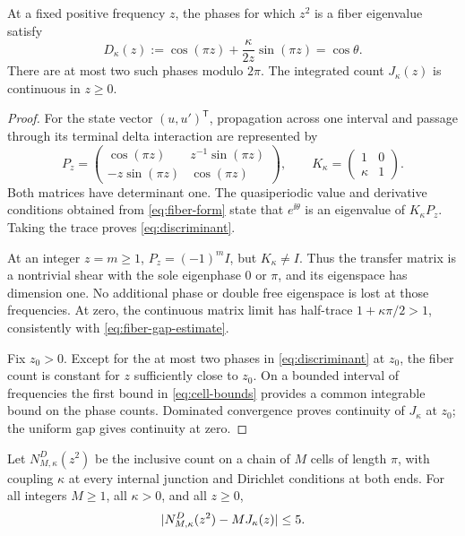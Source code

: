 \begin{lemma}
\label{lem:phase}
At a fixed positive frequency $z$, the phases for which $z^2$
is a fiber eigenvalue satisfy
\begin{equation}
 D_\kappa(z):=\cos(\pi z)+\frac{\kappa}{2z}\sin(\pi z)
                   =\cos\theta.
 \label{eq:discriminant}
\end{equation}
There are at most two such phases modulo $2\pi$.
The integrated count $J_\kappa(z)$ is continuous in $z\ge0$.
\end{lemma}

\begin{proof}
For the state vector $(u,u')^{\mathsf T}$, propagation across
one interval and passage through its terminal delta interaction
are represented by
\begin{equation}
 P_z=\begin{pmatrix}
       \cos(\pi z)&z^{-1}\sin(\pi z)\\
       -z\sin(\pi z)&\cos(\pi z)
     \end{pmatrix},
 \qquad
 K_\kappa=\begin{pmatrix}1&0\\\kappa&1\end{pmatrix}.
 \label{eq:transfer-matrices}
\end{equation}
Both matrices have determinant one. The quasiperiodic value
and derivative conditions obtained from \eqref{eq:fiber-form}
state that $e^{\ii\theta}$ is an eigenvalue of $K_\kappa P_z$.
Taking the trace proves \eqref{eq:discriminant}.

At an integer $z=m\ge1$, $P_z=(-1)^m I$, but
$K_\kappa\ne I$. Thus the transfer matrix is a nontrivial
shear with the sole eigenphase $0$ or $\pi$, and its eigenspace
has dimension one. No additional phase or double free eigenspace
is lost at those frequencies. At zero, the continuous matrix
limit has half-trace $1+\kappa\pi/2>1$, consistently with
\eqref{eq:fiber-gap-estimate}.

Fix $z_0>0$. Except for the at most two phases in
\eqref{eq:discriminant} at $z_0$, the fiber count is constant
for $z$ sufficiently close to $z_0$. On a bounded interval of
frequencies the first bound in \eqref{eq:cell-bounds} provides
a common integrable bound on the phase counts. Dominated
convergence proves continuity of $J_\kappa$ at $z_0$; the
uniform gap gives continuity at zero.
\end{proof}

\begin{proposition}
\label{prop:finite-chain}
Let $N^D_{M,\kappa}(z^2)$ be the inclusive count on a chain
of $M$ cells of length $\pi$, with coupling $\kappa$ at every
internal junction and Dirichlet conditions at both ends.
For all integers $M\ge1$, all $\kappa>0$, and all $z\ge0$,
\begin{equation}
 \lvert N^D_{M,\kappa}(z^2)-M J_\kappa(z)\rvert\le5.
 \label{eq:finite-chain-error}
\end{equation}
\end{proposition}

